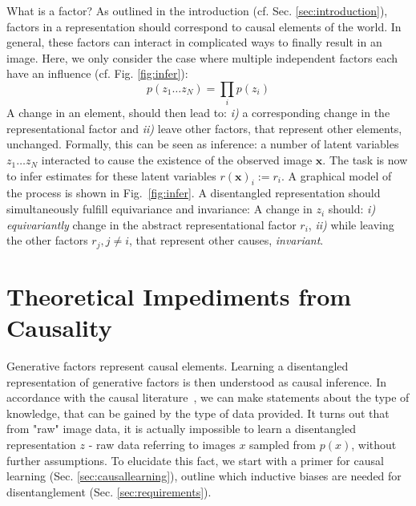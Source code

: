 		What is a factor? As outlined in the introduction (cf. Sec. \ref{sec:introduction}), factors in a representation should correspond to causal elements of the world.
		In general, these factors can interact in complicated ways to finally result in an image. Here, we only consider the case where multiple independent factors each have an influence (cf. Fig. \ref{fig:infer}):
		\begin{equation}\label{eq:independent}
			p(z_1 \ldots z_N) = \prod_i p(z_i)
		\end{equation}
		A change in an element, should then lead to: \emph{i)} a corresponding change in the representational factor and \emph{ii)} leave other factors, that represent other elements, unchanged.
		Formally, this can be seen as inference: a number of latent variables ${z_1}\ldots{z_N}$ interacted to cause the existence of the observed image $\mathbf{x}$. The task is now to infer estimates for these latent variables $r(\mathbf{x})_i:=r_i$. A graphical model of the process is shown in Fig.~\ref{fig:infer}.
		A disentangled representation should simultaneously fulfill equivariance and invariance: A change in ${z_i}$ should: \emph{i)} \textit{equivariantly} change in the abstract representational factor $r_i$, \emph{ii)} while leaving the other factors $r_j, j\neq i$, that represent other causes, \textit{invariant}.


\section{Theoretical Impediments from Causality}\label{sec:causality}


	Generative factors represent causal elements.
	Learning a disentangled representation of generative factors is then understood as causal inference.
	In accordance with the causal literature~\cite{pearl18impediments}, we can make statements about the type of knowledge, that can be gained by the type of data provided. It turns out that from "raw" image data, it is actually impossible to learn a disentangled representation $z$ - raw data referring to images $x$ sampled from $p(x)$, without further assumptions.
	To elucidate this fact, we start with a primer for causal learning (Sec. \ref{sec:causallearning}), outline which inductive biases are needed for disentanglement (Sec. \ref{sec:requirements}).

